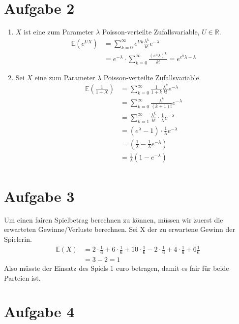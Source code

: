 \documentclass[10pt,a4paper,parskip=half]{scrartcl}
\newcommand{\E}{\mathbb{E}}
\newcommand{\R}{\mathbb{R}}
\begin{document}
\section*{Aufgabe 2}
\begin{enumerate}
\item $X$ ist eine zum Parameter $\lambda$ Poisson-verteilte Zufallsvariable, $U \in \R$.
\begin{align*}
\E(e^{UX}) &= \sum^{\infty}_{k=0} e^{Uk}\frac{\lambda^k}{k!} e^{-\lambda} \\
&= e^{-\lambda}\cdot \sum_{k=0}^{\infty} \frac{(e^u\lambda)^k}{k!} = e^{e^u\lambda - \lambda}
\end{align*}
\item Sei $X$ eine zum Parameter $\lambda$ Poisson-verteilte Zufallsvariable.
\begin{align*}
\E\left(\frac{1}{1+X}\right) &= \sum^{\infty}_{k=0} \frac{1}{1+k}\frac{\lambda^k}{k!} e^{-\lambda} \\
&= \sum^{\infty}_{k=0} \frac{\lambda^k}{(k+1)!} e^{-\lambda} \\
&= \sum^{\infty}_{k=1} \frac{\lambda^{k}}{k!}\cdot \frac1\lambda e^{-\lambda} \\
&= (e^\lambda - 1) \cdot \frac1\lambda e^{-\lambda} \\
&= (\frac1\lambda  - \frac1\lambda e^{-\lambda}) \\
&= \frac{1}{\lambda}(1 - e^{-\lambda}) \\
\end{align*}
\end{enumerate}
\section*{Aufgabe 3}
Um einen fairen Spielbetrag berechnen zu können, müssen wir zuerst die erwarteten Gewinne/Verluste berechnen. Sei X der zu erwartene Gewinn der Spielerin.
\begin{align*}
\E(X) &= 2 \cdot \frac{1}{6} + 6 \cdot \frac{1}{6} + 10 \cdot \frac{1}{6}  - 2 \cdot \frac{1}{6} + 4 \cdot \frac{1}{6} + 6 \frac{1}{6} \\
&= 3 - 2 = 1
\end{align*}
Also müsste der Einsatz des Spiels 1 euro betragen, damit es fair für beide Parteien ist.
\section*{Aufgabe 4}
\end{document}

